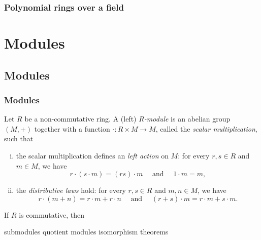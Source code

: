 \documentclass{../note}
\begin{document}
\section{Polynomial rings over a field}
\begin{prb}
\end{prb}
\begin{prb}
\end{prb}
\begin{prb}
\end{prb}











\part{Modules}



\chapter{Modules}
\section{Modules}

\begin{prb}
Let $R$ be a non-commutative ring.
A (left) \emph{$R$-module} is an abelian group $(M,+)$ together with a function $\cdot:R\times M\to M$, called the \emph{scalar multiplication}, such that
\begin{enumerate}[(i)]
\item the scalar multiplication defines an \emph{left action} on $M$: for every $r,s\in R$ and $m\in M$, we have
\[r\cdot(s\cdot m)=(rs)\cdot m\quad\text{ and }\quad1\cdot m=m,\]
\item the \emph{distributive laws} hold: for every $r,s\in R$ and $m,n\in M$, we have
\[r\cdot (m+n)=r\cdot m+r\cdot n\quad\text{ and }\quad(r+s)\cdot m=r\cdot m+s\cdot m.\]
\end{enumerate}
\begin{parts}
\item If $R$ is commutative, then
\end{parts}
\end{prb}

submodules
quotient modules
isomorphism theorems
\end{document}
